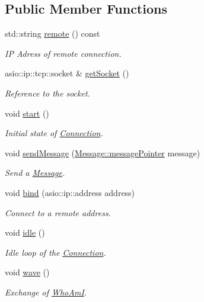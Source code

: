 \subsection*{Public Member Functions}
\begin{DoxyCompactItemize}
\item 
std\+::string \mbox{\hyperlink{classConnection_ae1d2f498761143716cc12fdc76b46203}{remote}} () const
\begin{DoxyCompactList}\small\item\em IP Adress of remote connection. \end{DoxyCompactList}\item 
asio\+::ip\+::tcp\+::socket \& \mbox{\hyperlink{classConnection_ac854436a3a6fdf7fdb16be04b9696447}{get\+Socket}} ()
\begin{DoxyCompactList}\small\item\em Reference to the socket. \end{DoxyCompactList}\item 
void \mbox{\hyperlink{classConnection_a47c25a31352a71e2a6902d37fc5fa2ba}{start}} ()
\begin{DoxyCompactList}\small\item\em Initial state of \mbox{\hyperlink{classConnection}{Connection}}. \end{DoxyCompactList}\item 
void \mbox{\hyperlink{classConnection_ad8fa49332af5ccc42768f94bdf711187}{send\+Message}} (\mbox{\hyperlink{classMessage_a3f7f2aa1058cb5f0b74a1fbb7fcd00e5}{Message\+::message\+Pointer}} message)
\begin{DoxyCompactList}\small\item\em Send a \mbox{\hyperlink{classMessage}{Message}}. \end{DoxyCompactList}\item 
void \mbox{\hyperlink{classConnection_a765fb34abf97d31b9c2c49e1e1c76a00}{bind}} (asio\+::ip\+::address address)
\begin{DoxyCompactList}\small\item\em Connect to a remote address. \end{DoxyCompactList}\item 
void \mbox{\hyperlink{classConnection_a4f79c85d33fd0a9e640405ec665cc01d}{idle}} ()
\begin{DoxyCompactList}\small\item\em Idle loop of the \mbox{\hyperlink{classConnection}{Connection}}. \end{DoxyCompactList}\item 
void \mbox{\hyperlink{classConnection_a2e12f0ca3e66692c1bc3ad858dfa2d4e}{wave}} ()
\begin{DoxyCompactList}\small\item\em Exchange of \mbox{\hyperlink{classWhoAmI}{Who\+AmI}}. \end{DoxyCompactList}\end{DoxyCompactItemize}
